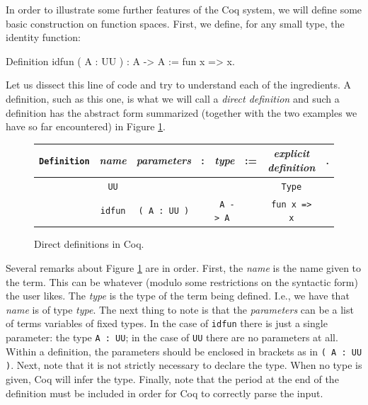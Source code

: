 In order to illustrate some further features of the Coq system, we
will define some basic construction on function spaces.  First, we
define, for any small type, the identity function:
\begin{center}
  \begin{coqcode}
Definition idfun ( A : UU ) : A -> A := fun x => x.
  \end{coqcode}
\end{center}
Let us dissect this line of code and try to understand each of the
ingredients.  A definition, such as this one, is what we will call a
\emph{direct definition} and such a definition has the abstract form
summarized (together with the two examples we have so far encountered)
in Figure \ref{fig:direct}.
\begin{figure}[ht]
  \centering
  \begin{tabular}{cccccccc}
    \verb|Definition| & \emph{name} &
    \emph{parameters} & : & \emph{type} & := &
    \emph{explicit definition} & .\\
    \hline
    & \verb|UU| & & & & & \verb|Type| &\\
    & \verb|idfun| & \verb|( A : UU )| &  &
    \verb| A -> A | & & \verb|fun x => x| &
  \end{tabular}
  \caption{Direct definitions in Coq.}
  \label{fig:direct}
\end{figure}

Several remarks about Figure \ref{fig:direct} are in order.  First, the \emph{name} is the name
given to the term.  This can be whatever (modulo some restrictions on
the syntactic form) the user likes.  The \emph{type} is the type of
the term being defined.  I.e., we have that \emph{name} is of type
\emph{type}.  The next thing to note is that the \emph{parameters} can
be a list of terms variables of fixed types.  In the case of
\verb|idfun| there is just a single parameter: the type
\verb|A : UU|; in the case of \verb|UU| there are no
parameters at all.  Within a definition, the parameters should be
enclosed in brackets as in \verb|( A : UU )|.  Next, note that
it is not strictly necessary to declare the type.  When no type is
given, Coq will infer the type.  Finally, note that the period at the
end of the definition must be included in order for Coq to correctly
parse the input.

